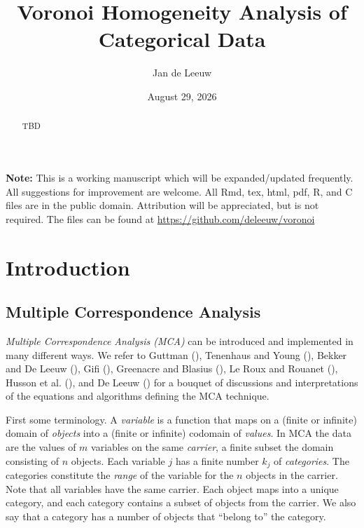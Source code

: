 \documentclass[
  12pt,
  letterpaper,
  DIV=11,
  numbers=noendperiod]{scrartcl}
\title{Voronoi Homogeneity Analysis of Categorical Data}
\author{Jan de Leeuw}
\date{August 29, 2026}
\newcommand{\sectionbreak}{\clearpage}
\renewcommand*\contentsname{Table of contents}
\newcommand\contentsname{Table of contents}
\begin{document}
\maketitle
\begin{abstract}
TBD
\end{abstract}

\renewcommand*\contentsname{Table of contents}
{
\setcounter{tocdepth}{3}
\tableofcontents
}

\sectionbreak

\textbf{Note:} This is a working manuscript which will be
expanded/updated frequently. All suggestions for improvement are
welcome. All Rmd, tex, html, pdf, R, and C files are in the public
domain. Attribution will be appreciated, but is not required. The files
can be found at \url{https://github.com/deleeuw/voronoi}

\sectionbreak

\section{Introduction}\label{introduction}

\subsection{Multiple Correspondence
Analysis}\label{multiple-correspondence-analysis}

\emph{Multiple Correspondence Analysis (MCA)} can be introduced and
implemented in many different ways. We refer to Guttman
(), Tenenhaus and Young
(), Bekker and De Leeuw
(), Gifi
(), Greenacre and Blasius
(), Le Roux and Rouanet
(), Husson et al.
(), and De Leeuw
() for a bouquet of discussions and
interpretations of the equations and algorithms defining the MCA
technique.

First some terminology. A \emph{variable} is a function that maps on a
(finite or infinite) domain of \emph{objects} into a (finite or
infinite) codomain of \emph{values}. In MCA the data are the values of
\(m\) variables on the same \emph{carrier}, a finite subset the domain
consisting of \(n\) objects. Each variable \(j\) has a finite number
\(k_j\) of \emph{categories}. The categories constitute the \emph{range}
of the variable for the \(n\) objects in the carrier. Note that all
variables have the same carrier. Each object maps into a unique
category, and each category contains a subset of objects from the
carrier. We also say that a category has a number of objects that
``belong to'' the category.
\end{document}
